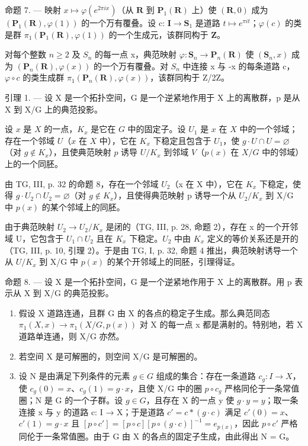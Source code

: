 命题 7. --- 映射 \(x \mapsto \varphi(e^{2\pi ix})\)（从 \(\mathbf{R}\) 到 \(\mathbf{P}_{1}(\mathbf{R})\) 上）使 \((\mathbf{R},0)\) 成为 \((\mathbf{P}_{1}(\mathbf{R}),\varphi(1))\) 的一个万有覆叠。设 c: \(\mathbf{I} \to \mathbf{S}_{1}\) 是道路 \(t \mapsto e^{\pi it}\)；\(\varphi(c)\) 的类是群 \(\pi_1(\mathbf{P}_{1}(\mathbf{R}), \varphi(1))\) 的一个生成元，该群同构于 \(\mathbf{Z}\)。

对每个整数 \(n \geqslant 2\) 及 \(S_{n}\) 的每一点 x，典范映射 \(\varphi: \mathbf{S}_{n} \to \mathbf{P}_{n}(\mathbf{R})\) 使 \((\mathbf{S}_{n}, x)\) 成为 \((\mathbf{P}_{n}(\mathbf{R}), \varphi(x))\) 的一个万有覆叠。对 \(S_{n}\) 中连接 x 与 -x 的每条道路 c，\(\varphi \circ c\) 的类生成群 \(\pi_{1}(\mathbf{P}_{n}(\mathbf{R}), \varphi(x))\)，该群同构于 Z/2Z。


引理 1. --- 设 X 是一个拓扑空间，G 是一个逆紧地作用于 X 上的离散群，p 是从 X 到 X/G 上的典范投影。

设 \(x\) 是 \(X\) 的一点，\(K_x\) 是它在 \(G\) 中的固定子。设 \(U_1\) 是 \(x\) 在 \(X\) 中的一个邻域；存在一个邻域 \(U\)（\(x\) 在 \(X\) 中），它在 \(K_x\) 下稳定且包含于 \(U_1\)，使 \(g \cdot U \cap U = \varnothing\)（对 \(g \notin K_x\)），且使典范映射 \(p\) 诱导 \(U / K_x\) 到邻域 \(V\)（\(p(x)\) 在 \(X / G\) 中的邻域）上的一个同胚。

由 TG, III, p. 32 的命题 8，存在一个邻域 \(U_{2}\)（x 在 X 中），它在 \(K_{x}\) 下稳定，使得 \(g \cdot U_{2} \cap U_{2} = \varnothing\)（对 \(g \notin K_{x}\)），且使得典范映射 p 诱导一个从 \(U_{2}/K_{x}\) 到 X/G 中 \(p(x)\) 的某个邻域上的同胚。

由于典范映射 \(U_{2} \rightarrow U_{2}/K_{x}\) 是闭的（TG, III, p. 28, 命题 2），存在 x 的一个开邻域 U，它包含于 \(U_{1} \cap U_{2}\) 且在 \(K_{x}\) 下稳定。\(U_{2}\) 中由 \(K_{x}\) 定义的等价关系还是开的（TG, III, p. 10, 引理 2）。于是由 TG, I, p. 32, 命题 4 推出，典范映射诱导一个从 \(U/K_{x}\) 到 X/G 中 \(p(x)\) 的某个开邻域上的同胚，引理得证。

命题 8. --- 设 X 是一个拓扑空间，G 是一个逆紧地作用于 X 上的离散群。用 p 表示从 X 到 X/G 的典范投影。

\begin{enumerate}
\def\labelenumi{\alph{enumi})}
\item
  假设 X 道路连通，且群 G 由 X 的各点的稳定子生成。那么典范同态 \(\pi_{1}(X,x)\to\pi_{1}(X/G,p(x))\) 对 X 的每一点 x 都是满射的。特别地，若 X 道路单连通，则 X/G 亦然。
\item
  若空间 X 是可解圈的，则空间 X/G 是可解圈的。
\item
  设 N 是由满足下列条件的元素 \(g \in G\) 组成的集合：存在一条道路 \(c_{g} \colon I \to X\)，使 \(c_{g}(0) = x\)、\(c_{g}(1) = g \cdot x\)，且使 X/G 中的圈 \(p \circ c_{g}\) 严格同伦于一条常值圈；N 是 G 的一个子群。设 \(g \in G\)，且存在 X 的一点 y 使 \(g \cdot y = y\)；取一条连接 x 与 y 的道路 c: I → X；于是道路 \(c' = c * (g \cdot c)\) 满足 \(c'(0) = x\)、\(c'(1) = g \cdot x\) 且 \([p \circ c'] = [p \circ c][p \circ (g \cdot c)]^{-1} = e_{p(x)}\)，因此 \(p \circ c'\) 严格同伦于一条常值圈。由于 G 由 X 的各点的固定子生成，由此得出 N = G。
\end{enumerate}

